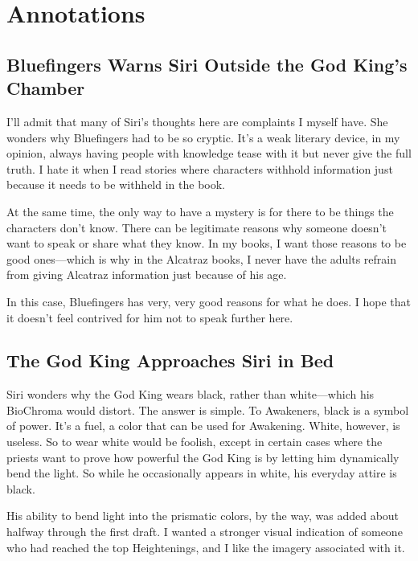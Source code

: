\section*{Annotations}

\subsection*{Bluefingers Warns Siri Outside the God King’s Chamber}

I’ll admit that many of Siri’s thoughts here are complaints I myself have. She wonders why Bluefingers had to be so cryptic. It’s a weak literary device, in my opinion, always having people with knowledge tease with it but never give the full truth. I hate it when I read stories where characters withhold information just because it needs to be withheld in the book.

At the same time, the only way to have a mystery is for there to be things the characters don’t know. There can be legitimate reasons why someone doesn’t want to speak or share what they know. In my books, I want those reasons to be good ones—which is why in the Alcatraz books, I never have the adults refrain from giving Alcatraz information just because of his age.

In this case, Bluefingers has very, very good reasons for what he does. I hope that it doesn’t feel contrived for him not to speak further here.

\subsection*{The God King Approaches Siri in Bed}

Siri wonders why the God King wears black, rather than white—which his BioChroma would distort. The answer is simple. To Awakeners, black is a symbol of power. It’s a fuel, a color that can be used for Awakening. White, however, is useless. So to wear white would be foolish, except in certain cases where the priests want to prove how powerful the God King is by letting him dynamically bend the light. So while he occasionally appears in white, his everyday attire is black.

His ability to bend light into the prismatic colors, by the way, was added about halfway through the first draft. I wanted a stronger visual indication of someone who had reached the top Heightenings, and I like the imagery associated with it.

